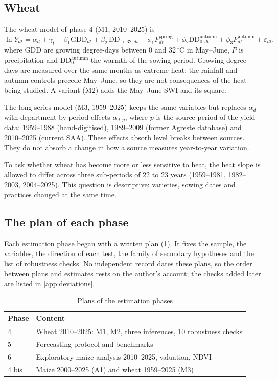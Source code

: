 \subsection{Wheat}

The wheat model of phase 4 (M1, 2010--2025) is
\begin{equation}
\label{eq:m1}
\ln Y_{dt} = \alpha_d + \gamma_t + \beta_1 \mathrm{GDD}_{dt} + \beta_2\, \mathrm{DD}_{>32,dt} + \phi_1 P^{\mathrm{spring}}_{dt} + \phi_2 \mathrm{DD}^{\mathrm{autumn}}_{0,dt} + \phi_3 P^{\mathrm{autumn}}_{dt} + \varepsilon_{dt},
\end{equation}
where GDD are growing degree-days between 0 and 32\,$^{\circ}$C in May--June, $P$ is precipitation and $\mathrm{DD}^{\mathrm{autumn}}_{0}$ the warmth of the sowing period. Growing degree-days are measured over the same months as extreme heat; the rainfall and autumn controls precede May--June, so they are not consequences of the heat being studied. A variant (M2) adds the May--June SWI and its square.

The long-series model (M3, 1959--2025) keeps the same variables but replaces $\alpha_d$ with department-by-period effects $\alpha_{d,p}$, where $p$ is the source period of the yield data: 1959--1988 (hand-digitised), 1989--2009 (former Agreste database) and 2010--2025 (current SAA). These effects absorb level breaks between sources. They do not absorb a change in how a source measures year-to-year variation.

To ask whether wheat has become more or less sensitive to heat, the heat slope is allowed to differ across three sub-periods of 22 to 23 years (1959--1981, 1982--2003, 2004--2025). This question is descriptive: varieties, sowing dates and practices changed at the same time.

\subsection{The plan of each phase}

Each estimation phase began with a written plan (\cref{tab:specs}). It fixes the sample, the variables, the direction of each test, the family of secondary hypotheses and the list of robustness checks. No independent record dates these plans, so the order between plans and estimates rests on the author's account; the checks added later are listed in \cref{app:deviations}.

\begin{table}[H]
\centering
\small
\caption{Plans of the estimation phases}
\label{tab:specs}
\begin{tabular}{>{\raggedright}p{2.4cm}>{\raggedright\arraybackslash}p{10.4cm}}
\toprule
Phase & Content \\
\midrule
4 & Wheat 2010--2025: M1, M2, three inferences, 10 robustness checks \\
5 & Forecasting protocol and benchmarks \\
6 & Exploratory maize analysis 2010--2025, valuation, NDVI \\
4 bis & Maize 2000--2025 (A1) and wheat 1959--2025 (M3) \\
\bottomrule
\end{tabular}
\end{table}

